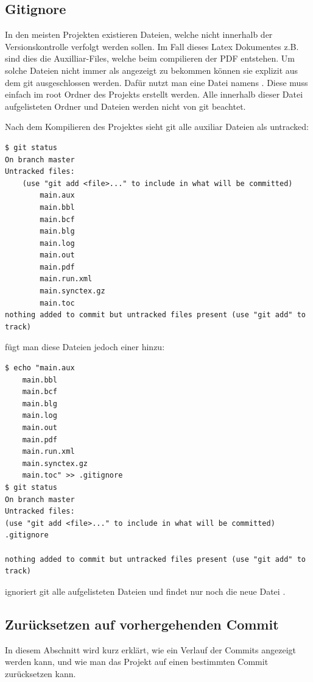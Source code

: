 \subsection{Gitignore}
In den meisten Projekten existieren Dateien, welche nicht innerhalb der Versionskontrolle verfolgt werden sollen. Im Fall dieses Latex Dokumentes z.B. sind dies die Auxilliar-Files, welche beim compilieren der PDF entstehen. Um solche Dateien nicht immer als  angezeigt zu bekommen können sie explizit aus dem git ausgeschlossen werden. Dafür nutzt man eine Datei namens . Diese muss einfach im root Ordner des Projekts erstellt werden. Alle innerhalb dieser Datei aufgelisteten Ordner und Dateien werden nicht von git beachtet.

Nach dem Kompilieren des Projektes sieht git alle auxiliar Dateien als untracked:
\begin{lstlisting}
$ git status
On branch master
Untracked files:
	(use "git add <file>..." to include in what will be committed)
		main.aux
		main.bbl
		main.bcf
		main.blg
		main.log
		main.out
		main.pdf
		main.run.xml
		main.synctex.gz
		main.toc
nothing added to commit but untracked files present (use "git add" to track)

\end{lstlisting}
fügt man diese Dateien jedoch einer  hinzu:
\begin{lstlisting}
$ echo "main.aux
	main.bbl
	main.bcf
	main.blg
	main.log
	main.out
	main.pdf
	main.run.xml
	main.synctex.gz
	main.toc" >> .gitignore
$ git status
On branch master
Untracked files:
(use "git add <file>..." to include in what will be committed)
.gitignore

nothing added to commit but untracked files present (use "git add" to track)
\end{lstlisting}
ignoriert git alle aufgelisteten Dateien und findet nur noch die neue Datei .

\subsection{Zurücksetzen auf vorhergehenden Commit}
In diesem Abschnitt wird kurz erklärt, wie ein Verlauf der Commits angezeigt werden kann, und wie man das Projekt auf einen bestimmten Commit zurücksetzen kann.

